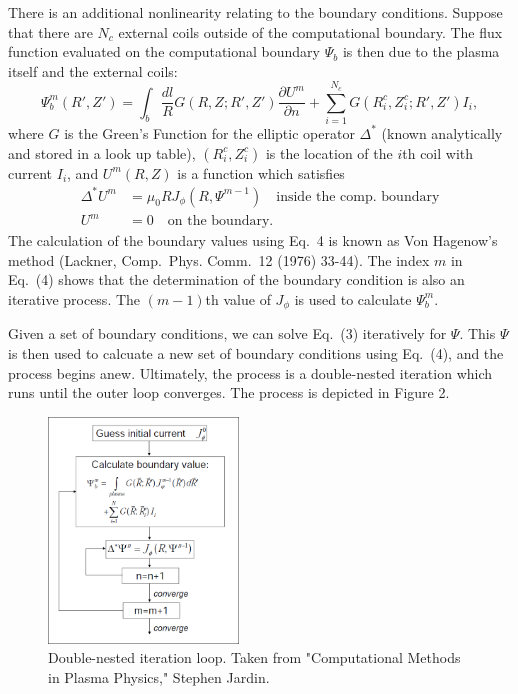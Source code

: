 \documentclass[paper=a4, fontsize=11pt]{scrartcl} %
\begin{document}
There is an additional nonlinearity relating to the boundary conditions.  Suppose that there are $N_c$ external coils outside of the computational boundary.  The flux function evaluated on the computational boundary $\Psi_b$ is then due to the plasma itself and the external coils:
\begin{equation}
\Psi^m_b (R',Z') = \int_{b} \frac{dl}{R} G(R,Z; R',Z') \frac{\partial U^m}{\partial n} + \sum_{i=1}^{N_c} G(R_i^c,Z_i^c; R',Z') I_i,
\end{equation}
where $G$ is the Green's Function for the elliptic operator $\Delta^{*}$ (known analytically and stored in a look up table), $(R_i^c,Z_i^c)$ is the location of the $i$th coil with current $I_i$, and $U^m(R,Z)$ is a function which satisfies
\begin{align}
\Delta^{*} U^m &= \mu_0 R J_\phi (R, \Psi^{m-1}) \quad \mbox{inside the comp.~boundary} \\
U^m &= 0 \quad \mbox{on the boundary}.
\end{align}
The calculation of the boundary values using Eq.~4 is known as Von Hagenow's method (Lackner, Comp.~Phys. Comm.~12 (1976) 33-44).
The index $m$ in Eq.~(4) shows that the determination of the boundary condition is also an iterative process.  The $(m-1)$th value of $J_\phi$ is used to calculate $\Psi_b^m$.  

Given a set of boundary conditions, we can solve Eq.~(3) iteratively for $\Psi$.  This $\Psi$ is then used to calcuate a new set of boundary conditions using Eq.~(4), and the process begins anew.  Ultimately, the process is a double-nested iteration which runs until the outer loop converges.  The process is depicted in Figure 2.

\begin{figure}
\centering
\captionsetup{justification=centering,margin=3cm}
\caption[caption]{Double-nested iteration loop. Taken from "Computational Methods in Plasma Physics," Stephen Jardin.}
\includegraphics[width=0.45\textwidth]{algorithm}
\end{figure}
\end{document}
